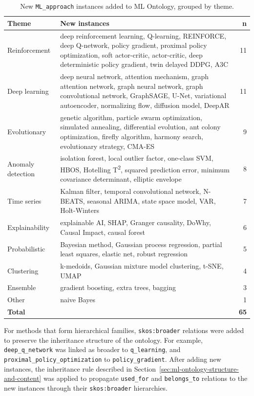 \begin{table}[H]
\centering
\caption[New ML\_approach instances]{New \texttt{ML\_approach} instances added to ML Ontology, grouped by theme.}
\label{tab:new-ml-approaches}
\begin{tabularx}{\textwidth}{lXr}
\toprule
\textbf{Theme} & \textbf{New instances} & \textbf{n} \\
\midrule
Reinforcement
  & deep reinforcement learning, Q-learning, REINFORCE, deep Q-network, policy gradient, proximal policy optimization, soft actor-critic, actor-critic, deep deterministic policy gradient, twin delayed DDPG, A3C & 11 \\
\midrule
Deep learning
  & deep neural network, attention mechanism, graph attention network, graph neural network, graph convolutional network, GraphSAGE, U-Net, variational autoencoder, normalizing flow, diffusion model, DeepAR & 11 \\
\midrule
Evolutionary
  & genetic algorithm, particle swarm optimization, simulated annealing, differential evolution, ant colony optimization, firefly algorithm, harmony search, evolutionary strategy, CMA-ES & 9 \\
\midrule
Anomaly detection
  & isolation forest, local outlier factor, one-class SVM, HBOS, Hotelling T\textsuperscript{2}, squared prediction error, minimum covariance determinant, elliptic envelope & 8 \\
\midrule
Time series
  & Kalman filter, temporal convolutional network, N-BEATS, seasonal ARIMA, state space model, VAR, Holt-Winters & 7 \\
\midrule
Explainability
  & explainable AI, SHAP, Granger causality, DoWhy, Causal Impact, causal forest & 6 \\
\midrule
Probabilistic
  & Bayesian method, Gaussian process regression, partial least squares, elastic net, robust regression & 5 \\
\midrule
Clustering
  & k-medoids, Gaussian mixture model clustering, t-SNE, UMAP & 4 \\
\midrule
Ensemble
  & gradient boosting, extra trees, bagging & 3 \\
\midrule
Other
  & naive Bayes & 1 \\
\midrule
\textbf{Total} & & \textbf{65} \\
\bottomrule
\end{tabularx}
\end{table}

For methods that form hierarchical families, \texttt{skos:broader} 
relations were added to preserve the inheritance structure of the 
ontology. For example, \texttt{deep\_q\_network} was linked as 
broader to \texttt{q\_learning}, and 
\texttt{proximal\_policy\_optimization} to \texttt{policy\_gradient}. 
After adding new instances, the inheritance rule described in 
Section~\ref{sec:ml-ontology-structure-and-content} was applied to propagate 
\texttt{used\_for} and \texttt{belongs\_to} relations to the new 
instances through their \texttt{skos:broader} hierarchies.


